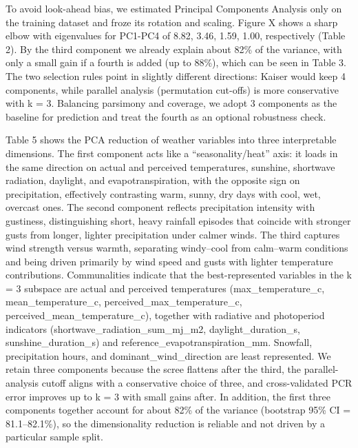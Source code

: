 \documentclass[
]{article}
\begin{document}
To avoid look-ahead bias, we estimated Principal Components Analysis
only on the training dataset and froze its rotation and scaling. Figure
X shows a sharp elbow with eigenvalues for PC1-PC4 of 8.82, 3.46, 1.59,
1.00, respectively (Table 2). By the third component we already explain
about 82\% of the variance, with only a small gain if a fourth is added
(up to 88\%), which can be seen in Table 3. The two selection rules
point in slightly different directions: Kaiser would keep 4 components,
while parallel analysis (permutation cut-offs) is more conservative with
k = 3. Balancing parsimony and coverage, we adopt 3 components as the
baseline for prediction and treat the fourth as an optional robustness
check.

Table 5 shows the PCA reduction of weather variables into three
interpretable dimensions. The first component acts like a
``seasonality/heat'' axis: it loads in the same direction on actual and
perceived temperatures, sunshine, shortwave radiation, daylight, and
evapotranspiration, with the opposite sign on precipitation, effectively
contrasting warm, sunny, dry days with cool, wet, overcast ones. The
second component reflects precipitation intensity with gustiness,
distinguishing short, heavy rainfall episodes that coincide with
stronger gusts from longer, lighter precipitation under calmer winds.
The third captures wind strength versus warmth, separating windy--cool
from calm--warm conditions and being driven primarily by wind speed and
gusts with lighter temperature contributions. Communalities indicate
that the best-represented variables in the k = 3 subspace are actual and
perceived temperatures (max\_temperature\_c, mean\_temperature\_c,
perceived\_max\_temperature\_c, perceived\_mean\_temperature\_c),
together with radiative and photoperiod indicators
(shortwave\_radiation\_sum\_mj\_m2, daylight\_duration\_s,
sunshine\_duration\_s) and reference\_evapotranspiration\_mm. Snowfall,
precipitation hours, and dominant\_wind\_direction are least
represented. We retain three components because the scree flattens after
the third, the parallel-analysis cutoff aligns with a conservative
choice of three, and cross-validated PCR error improves up to k = 3 with
small gains after. In addition, the first three components together
account for about 82\% of the variance (bootstrap 95\% CI =
81.1--82.1\%), so the dimensionality reduction is reliable and not
driven by a particular sample split.
\end{document}
